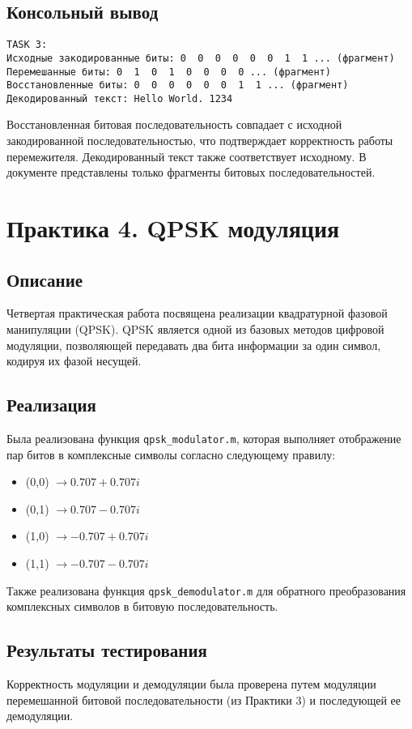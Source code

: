 \subsection{Консольный вывод}
\begin{verbatim}
TASK 3:
Исходные закодированные биты: 0  0  0  0  0  0  1  1 ... (фрагмент)
Перемешанные биты: 0  1  0  1  0  0  0  0 ... (фрагмент)
Восстановленные биты: 0  0  0  0  0  0  1  1 ... (фрагмент)
Декодированный текст: Hello World. 1234
\end{verbatim}
Восстановленная битовая последовательность совпадает с исходной закодированной последовательностью, что подтверждает корректность работы перемежителя. Декодированный текст также соответствует исходному. В документе представлены только фрагменты битовых последовательностей.

\section{Практика 4. QPSK модуляция}

\subsection{Описание}
Четвертая практическая работа посвящена реализации квадратурной фазовой манипуляции (QPSK). QPSK является одной из базовых методов цифровой модуляции, позволяющей передавать два бита информации за один символ, кодируя их фазой несущей.

\subsection{Реализация}
Была реализована функция \texttt{qpsk\_modulator.m}, которая выполняет отображение пар битов в комплексные символы согласно следующему правилу:
\begin{itemize}
    \item (0,0) $\rightarrow 0.707 + 0.707i$
    \item (0,1) $\rightarrow 0.707 - 0.707i$
    \item (1,0) $\rightarrow -0.707 + 0.707i$
    \item (1,1) $\rightarrow -0.707 - 0.707i$
\end{itemize}
Также реализована функция \texttt{qpsk\_demodulator.m} для обратного преобразования комплексных символов в битовую последовательность.

\subsection{Результаты тестирования}
Корректность модуляции и демодуляции была проверена путем модуляции перемешанной битовой последовательности (из Практики 3) и последующей ее демодуляции.

